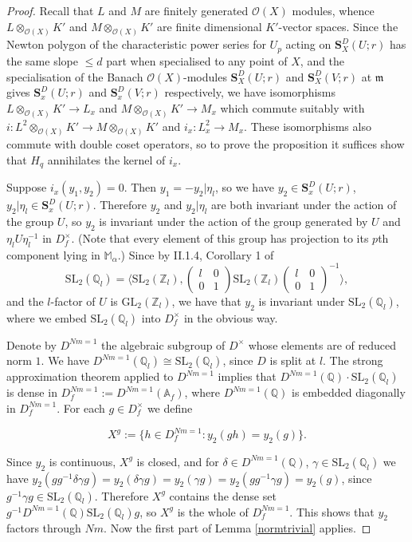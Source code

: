 \documentclass[a4paper, notitlepage]{amsart}
\newcommand{\Z}{\ensuremath{\mathbb{Z}}\xspace}
\newcommand{\Q}{\ensuremath{\mathbb{Q}}\xspace}
\newcommand{\A}{\ensuremath{\mathbb{A}}\xspace}
\newcommand{\m}{\ensuremath{\mathfrak{m}}\xspace}
\newcommand{\OO}{\ensuremath{\mathscr{O}}\xspace}
\newcommand{\OC}{\ensuremath{\mathbf{S}^D_{X}(U;r)}\xspace}
\newcommand{\OCV}{\ensuremath{\mathbf{S}^D_{X}(V;r)}\xspace}
\newcommand{\OCS}{\ensuremath{\mathbf{S}^D_{x}(U;r)}\xspace}
\newcommand{\OCVS}{\ensuremath{\mathbf{S}^D_{x}(V;r)}\xspace}
\begin{document}
\begin{proof}
Recall that $L$ and $M$ are finitely generated $\OO(X)$ modules, whence $L\otimes_{\OO(X)}K'$ and $M\otimes_{\OO(X)}K'$ are finite dimensional $K'$-vector spaces. Since the Newton polygon of the characteristic power series for $U_p$ acting on $\OC$ has the same slope $\le d$ part when specialised to any point of $X$, and the specialisation of the Banach $\OO(X)$-modules $\OC$ and $\OCV$ at $\m$ gives $\OCS$ and $\OCVS$ respectively, we have isomorphisms \\$L\otimes_{\OO(X)}K' \rightarrow L_x$ and $M\otimes_{\OO(X)}K' \rightarrow M_x$ which commute suitably with \\$i:L^2\otimes_{\OO(X)}K' \rightarrow M\otimes_{\OO(X)}K'$ and $i_x:L_x^2 \rightarrow M_x$. These isomorphisms also commute with double coset operators, so to prove the proposition it suffices show that $H_q$ annihilates the kernel of $i_x$. 

Suppose $i_x(y_1,y_2)=0$. Then $y_1=-y_2|\eta_l$, so we have $y_2 \in \OCS$, $y_2|\eta_l \in \OCS$. Therefore $y_2$ and $y_2|\eta_l$ are both invariant under the action of the group $U$, so $y_2$ is invariant under the action of the group generated by $U$ and $\eta_l U \eta_l^{-1}$ in $D_f^\times$. (Note that every element of this group has projection to its $p$th component lying in $\mathbb{M}_\alpha$.) Since by II.1.4, Corollary 1 of \cite{STrees} $$\mathrm{SL}_2(\Q_l)= \langle\mathrm{SL}_2(\Z_l),{\textstyle\begin{pmatrix}
l&0\\0&1
\end{pmatrix}}\mathrm{SL}_2(\Z_l){\textstyle\begin{pmatrix}
l&0\\0&1
\end{pmatrix}}^{-1}\rangle,
$$ and the $l$-factor of $U$ is $\mathrm{GL}_2(\Z_l)$, we have that $y_2$ is invariant under $\mathrm{SL}_2(\Q_l)$, where we embed $\mathrm{SL}_2(\Q_l)$ into $D_f^\times$ in the obvious way. 

Denote by $D^{Nm=1}$ the algebraic subgroup of $D^\times$ whose elements are of reduced norm $1$. We have $D^{Nm=1}(\Q_l) \cong \mathrm{SL}_2(\Q_l)$, since $D$ is split at $l$. The strong approximation theorem applied to $D^{Nm=1}$ implies that $D^{Nm=1}(\Q)\cdot\mathrm{SL}_2(\Q_l)$ is dense in $D^{Nm=1}_f:=D^{Nm=1}(\A_f)$, where $D^{Nm=1}(\Q)$ is embedded diagonally in $D^{Nm=1}_f$. For each $g\in D_f^\times$ we define

$$X^g:=\{h\in D_f^{Nm=1}: y_2(gh)=y_2(g)\}.$$

Since $y_2$ is continuous, $X^g$ is closed, and for $\delta \in D^{Nm=1}(\Q)$, $\gamma \in \mathrm{SL}_2(\Q_l)$ we have $y_2(gg^{-1}\delta\gamma g)=y_2(\delta\gamma g)=y_2(\gamma g)= y_2(g g^{-1}\gamma g) = y_2(g)$, since $g^{-1}\gamma g\in\mathrm{SL}_2(\Q_l)$.  Therefore $X^g$ contains the dense set $g^{-1}D^{Nm=1}(\Q)\mathrm{SL}_2(\Q_l)g$, so $X^g$ is the whole of $D^{Nm=1}_f$. This shows that $y_2$ factors through $Nm$. Now the first part of Lemma \ref{normtrivial} applies.
\end{proof}
\end{document}
